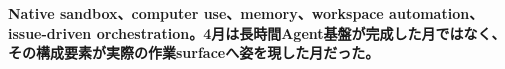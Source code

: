 \noindent\textbf{Native sandbox、computer use、memory、workspace automation、issue-driven orchestration。4月は長時間Agent基盤が完成した月ではなく、その構成要素が実際の作業surfaceへ姿を現した月だった。}\autocite{src-1ecdad90bfb4,src-20e34cbfb714,src-c71ef79e3212,src-f9ff221789e0}
